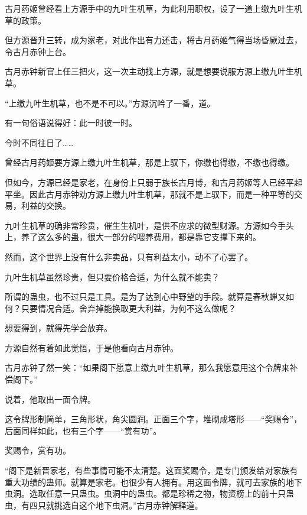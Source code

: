 
\begin{this_body}



古月药姬曾经看上方源手中的九叶生机草，为此利用职权，设了一道上缴九叶生机草的政策。

但方源晋升三转，成为家老，对此作出有力还击，将古月药姬气得当场昏厥过去，令古月赤钟上台。

古月赤钟新官上任三把火，这一次主动找上方源，就是想要说服方源上缴九叶生机草。

“上缴九叶生机草，也不是不可以。”方源沉吟了一番，道。

有一句俗语说得好：此一时彼一时。

今时不同往日了……

曾经古月药姬要方源上缴九叶生机草，那是上驭下，你缴也得缴，不缴也得缴。

但如今，方源已经是家老，在身份上只弱于族长古月博，和古月药姬等人已经平起平坐。因此古月赤钟劝方源上缴九叶生机草，那就不是上驭下，而是一种平等的交易，利益的交换。

九叶生机草的确非常珍贵，催生生机叶，是供不应求的微型财源。方源如今手头上，养了这么多的蛊，很大一部分的喂养费用，都是靠它支撑下来的。

然而，这个世界上没有什么非卖品，只有利益太小，动不了心罢了。

九叶生机草虽然珍贵，但只要价格合适，为什么就不能卖？

所谓的蛊虫，也不过只是工具。是为了达到心中野望的手段。就算是春秋蝉又如何？只要情况合适。舍弃掉能换取更大利益，为何不这么做呢？

想要得到，就得先学会放弃。

方源自然有着如此觉悟，于是他看向古月赤钟。

古月赤钟了然一笑：“如果阁下愿意上缴九叶生机草，那么我愿意用这个令牌来补偿阁下。”

说着，他取出一面令牌。

这令牌形制简单，三角形状，角尖圆润。正面三个字，堆砌成塔形——“奖赐令”，后面同样如此，也有三个字——“赏有功”。

奖赐令，赏有功。

“阁下是新晋家老，有些事情可能不太清楚。这面奖赐令，是专门颁发给对家族有重大功绩的蛊师。就算是家老。也很少有人拥有。用这面令牌，就可去家族的地下虫洞。选取任意一只蛊虫。虫洞中的蛊虫。都是珍稀之物，物资榜上的前十只蛊虫，有四只就挑选自这个地下虫洞。”古月赤钟解释道。


\end{this_body}
